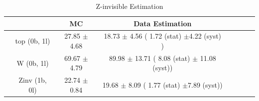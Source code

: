 \begin{table}[!htb]
\small
\setlength{\tabcolsep}{20pt} 
\begin{center} 
\begin{tabular}{lccccccc} 
\hline\hline
&                 &    MC                     & Data Estimation\\\hline \hline
& top  (0b, 1l)     & 27.85 $\pm$ 4.68             &18.73 $\pm$ 4.56 ( 1.72 (stat) $\pm$4.22 (syst) )\\
&  W   (0b, 1l)     & 69.67 $\pm$ 4.79            & 89.98 $\pm$ 13.71 ( 8.08 (stat) $\pm$ 11.08 (syst))\\ 
& Zinv (1b, 0l)           &  22.74 $\pm$ 0.84            &19.68 $\pm$ 8.09 ( 1.77 (stat) $\pm$7.89 (syst))\\


\hline\hline 
\end{tabular} 
\caption{Z-invisible Estimation}
\label{tab:ZinvFinalRes}
\end{center} 
\end{table}
